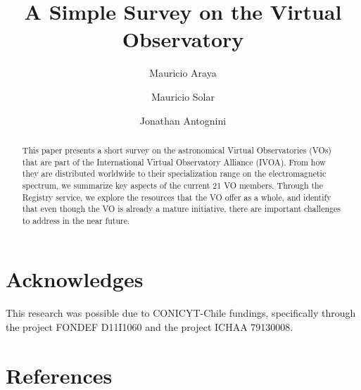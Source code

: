\documentclass[preprint]{elsarticle}
\begin{document}
\title{A Simple Survey on the Virtual Observatory}

\author[utfsm]{Mauricio Araya}


\author[utfsm]{Mauricio Solar}


\author[utfsm]{Jonathan Antognini}


\address[utfsm]{Universidad T\'ecnica Federico Santa Mar\'ia\\
Avenida Espa\~na 1680, Valpara\'iso, Chile}

\begin{abstract}
This paper presents a short survey on the astronomical Virtual Observatories (VOs) that are 
part of the International Virtual Observatory Alliance (IVOA). From how they are
distributed worldwide to their specialization range on the electromagnetic spectrum, 
we summarize key aspects of the current 21 VO members. Through the Registry
service, we explore the resources that the VO offer as a whole, and identify 
that even though the VO is already a mature initiative, there are important
challenges to address in the near future.
\end{abstract}

\maketitle



















\section*{Acknowledges}
This research was possible due to CONICYT-Chile fundings, specifically 
through the project FONDEF D11I1060 and the project ICHAA 79130008.

\section{References}





%



\end{document}
